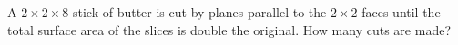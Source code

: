A $2\times2\times8$ stick of butter is cut by planes parallel to the $2\times2$ faces until the total surface area of the slices is double the original. How many cuts are made?
